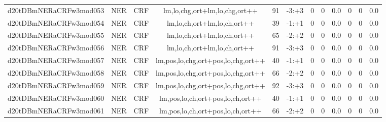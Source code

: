 \documentclass[a4paper]{article}
\begin{document}
\begin{landscape}
\begin{center}
\begin{tabular}{ |c|c|c|c|c|c|c|c|c|c|c|c|}
 
 	
 	\small{ d20tDBmNERaCRFw3mod053 } & \small{ NER} & \small{  CRF }  & lm,lo,chg,ort+lm,lo,chg,ort++  &  91 &  \small{  -3:+3 }  &  0 & 0 & 0.0  &  0 & 0 & 0.0 \\
 	

 
 	
 	\small{ d20tDBmNERaCRFw3mod054 } & \small{ NER} & \small{  CRF }  & lm,lo,ch,ort+lm,lo,ch,ort++  &  39 &  \small{  -1:+1 }  &  0 & 0 & 0.0  &  0 & 0 & 0.0 \\
 	

 
 	
 	\small{ d20tDBmNERaCRFw3mod055 } & \small{ NER} & \small{  CRF }  & lm,lo,ch,ort+lm,lo,ch,ort++  &  65 &  \small{  -2:+2 }  &  0 & 0 & 0.0  &  0 & 0 & 0.0 \\
 	

 
 	
 	\small{ d20tDBmNERaCRFw3mod056 } & \small{ NER} & \small{  CRF }  & lm,lo,ch,ort+lm,lo,ch,ort++  &  91 &  \small{  -3:+3 }  &  0 & 0 & 0.0  &  0 & 0 & 0.0 \\
 	

 
 	
 	\small{ d20tDBmNERaCRFw3mod057 } & \small{ NER} & \small{  CRF }  & lm,pos,lo,chg,ort+pos,lo,chg,ort++  &  40 &  \small{  -1:+1 }  &  0 & 0 & 0.0  &  0 & 0 & 0.0 \\
 	

 
 	
 	\small{ d20tDBmNERaCRFw3mod058 } & \small{ NER} & \small{  CRF }  & lm,pos,lo,chg,ort+pos,lo,chg,ort++  &  66 &  \small{  -2:+2 }  &  0 & 0 & 0.0  &  0 & 0 & 0.0 \\
 	

 
 	
 	\small{ d20tDBmNERaCRFw3mod059 } & \small{ NER} & \small{  CRF }  & lm,pos,lo,chg,ort+pos,lo,chg,ort++  &  92 &  \small{  -3:+3 }  &  0 & 0 & 0.0  &  0 & 0 & 0.0 \\
 	

 
 	
 	\small{ d20tDBmNERaCRFw3mod060 } & \small{ NER} & \small{  CRF }  & lm,pos,lo,ch,ort+pos,lo,ch,ort++  &  40 &  \small{  -1:+1 }  &  0 & 0 & 0.0  &  0 & 0 & 0.0 \\
 	

 
 	
 	\small{ d20tDBmNERaCRFw3mod061 } & \small{ NER} & \small{  CRF }  & lm,pos,lo,ch,ort+pos,lo,ch,ort++  &  66 &  \small{  -2:+2 }  &  0 & 0 & 0.0  &  0 & 0 & 0.0 \\
 	


\end{tabular}
\end{center}
\end{landscape}
\end{document}
